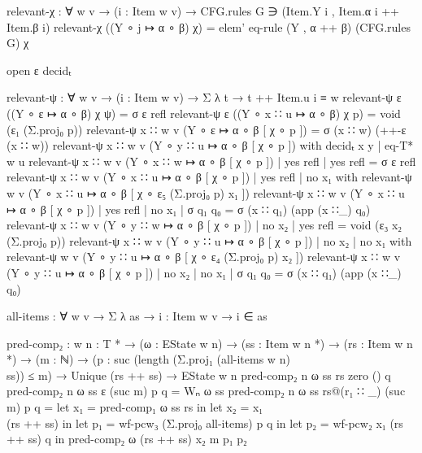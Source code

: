 {\begin{code}
			  relevant-χ : ∀ {w v} → (i : Item w v) → CFG.rules G ∋ (Item.Y i , Item.α i ++ Item.β i)
			  relevant-χ ((Y ∘ j ↦ α ∘ β) {χ}) = elem' eq-rule (Y , α ++ β) (CFG.rules G) χ

			  open ε decidₜ

			  relevant-ψ : ∀ {w v} → (i : Item w v) → Σ λ t → t ++ Item.u i ≡ w
			  relevant-ψ {ε} ((Y ∘ ε ↦ α ∘ β) {χ} {ψ}) = σ ε refl
			  relevant-ψ {ε} ((Y ∘ x ∷ u ↦ α ∘ β) {χ} {p}) = void (ε₁ (Σ.proj₀ p))
			  relevant-ψ {x ∷ w} {v} (Y ∘ ε ↦ α ∘ β [ χ ∘ p ]) = σ (x ∷ w) (++-ε (x ∷ w))
			  relevant-ψ {x ∷ w} {v} (Y ∘ y ∷ u ↦ α ∘ β [ χ ∘ p ]) with decidₜ x y | eq-T* w u
			  relevant-ψ {x ∷ w} {v} (Y ∘ x ∷ w ↦ α ∘ β [ χ ∘ p ]) | yes refl | yes refl = σ ε refl
			  relevant-ψ {x ∷ w} {v} (Y ∘ x ∷ u ↦ α ∘ β [ χ ∘ p ]) | yes refl | no x₁ with relevant-ψ {w} {v} (Y ∘ x ∷ u ↦ α ∘ β [ χ ∘ ε₅ (Σ.proj₀ p) x₁ ])
			  relevant-ψ {x ∷ w} {v} (Y ∘ x ∷ u ↦ α ∘ β [ χ ∘ p ]) | yes refl | no x₁ | σ q₁ q₀ = σ (x ∷ q₁) (app (x ∷_) q₀)
			  relevant-ψ {x ∷ w} {v} (Y ∘ y ∷ w ↦ α ∘ β [ χ ∘ p ]) | no x₂    | yes refl = void (ε₃ x₂ (Σ.proj₀ p))
			  relevant-ψ {x ∷ w} {v} (Y ∘ y ∷ u ↦ α ∘ β [ χ ∘ p ]) | no x₂    | no x₁ with relevant-ψ {w} {v} (Y ∘ y ∷ u ↦ α ∘ β [ χ ∘ ε₄ (Σ.proj₀ p) x₂ ])
			  relevant-ψ {x ∷ w} {v} (Y ∘ y ∷ u ↦ α ∘ β [ χ ∘ p ]) | no x₂    | no x₁ | σ q₁ q₀ = σ (x ∷ q₁) (app (x ∷_) q₀)

		\end{code}}
		\begin{code}
			  all-items : ∀ {w} {v} → Σ λ as → {i : Item w v} → i ∈ as
		\end{code}

		\begin{code}
			  pred-comp₂ : {w n : T *} →
			    (ω : EState w n) →
			    (ss : Item w n *) →
			    (rs : Item w n *) →
			    (m : ℕ) →
			    (p : suc (length (Σ.proj₁ (all-items {w} {n}) \\ ss)) ≤ m) →
			    Unique (rs ++ ss) →
			    EState w n
			  pred-comp₂ {n} ω ss rs zero () q
			  pred-comp₂ {n} ω ss ε (suc m) p q = Wₙ ω ss
			  pred-comp₂ {n} ω ss rs@(r₁ ∷ _) (suc m) p q =
			    let x₁ = pred-comp₁ ω ss rs in
			    let x₂ = x₁ \\ (rs ++ ss) in
			    let p₁ = wf-pcw₃ (Σ.proj₀ all-items) p q in
			    let p₂ = wf-pcw₂ x₁ (rs ++ ss) q in
			    pred-comp₂ ω (rs ++ ss) x₂ m p₁ p₂
		\end{code}

